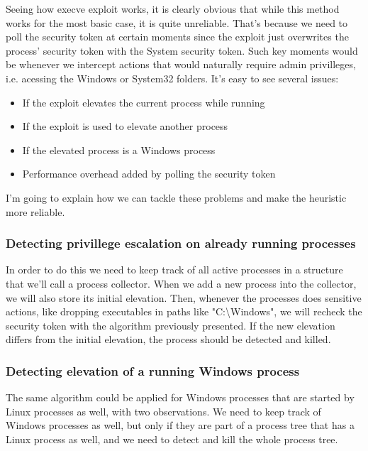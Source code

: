 \documentclass[conference]{IEEEtran}
\begin{document}
    \par{}
    Seeing how execve exploit works, it is clearly obvious that while this method works for the most basic case, it is quite unreliable. That's because we need to
    poll the security token at certain moments since the exploit just overwrites the process' security token with the System security token. Such
    key moments would be whenever we intercept actions that would naturally require admin privilleges, i.e. acessing the Windows or System32 folders.
    It's easy to see several issues:\\
    \begin{itemize}
        \item If the exploit elevates the current process while running
        \item If the exploit is used to elevate another process
        \item If the elevated process is a Windows process
        \item Performance overhead added by polling the security token
    \end{itemize}
    I'm going to explain how we can tackle these problems and make the heuristic more reliable.

    \subsubsection{Detecting privillege escalation on already running processes}
    In order to do this we need to keep track of all active processes in a structure that we'll call a process collector. When we add a new process
    into the collector, we will also store its initial elevation. Then, whenever the processes does sensitive actions, like dropping executables
    in paths like "C:\textbackslash Windows", we will recheck the security token with the algorithm previously presented. If the new elevation differs from the
    initial elevation, the process should be detected and killed.\\

    \subsubsection{Detecting elevation of a running Windows process}
    The same algorithm could be applied for Windows processes that are started by Linux processes as well, with two observations.
    We need to keep track of Windows processes as well, but only if they are part of a process tree that has a Linux process as well, and we
    need to detect and kill the whole process tree.\\
\end{document}
